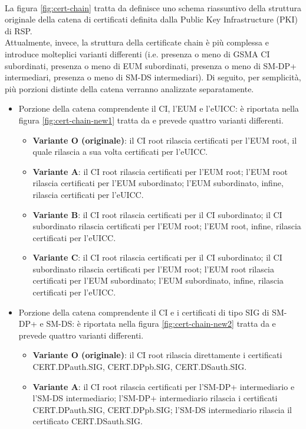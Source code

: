 \documentclass[10pt, oneside]{book}
\begin{document}
\\La figura \ref{fig:cert-chain} tratta da \cite{GSMA-docs-old} definisce uno schema riassuntivo della struttura originale della catena di certificati definita dalla Public Key Infrastructure (PKI) di RSP.\\
Attualmente, invece, la struttura della certificate chain è più complessa e introduce molteplici varianti differenti (i.e. presenza o meno di GSMA CI subordinati, presenza o meno di EUM subordinati, presenza o meno di SM-DP+ intermediari, presenza o meno di SM-DS intermediari). Di seguito, per semplicità, più porzioni distinte della catena verranno analizzate separatamente.
\begin{itemize}
\item Porzione della catena comprendente il CI, l'EUM e l'eUICC: è riportata nella figura \ref{fig:cert-chain-new1} tratta da \cite{GSMA-docs-new} e prevede quattro varianti differenti.
\begin{itemize}
\item \textbf{Variante O (originale)}: il CI root rilascia certificati per l'EUM root, il quale rilascia a sua volta certificati per l'eUICC.
\item \textbf{Variante A}: il CI root rilascia certificati per l'EUM root; l'EUM root rilascia certificati per l'EUM subordinato; l'EUM subordinato, infine, rilascia certificati per l'eUICC.
\item \textbf{Variante B}: il CI root rilascia certificati per il CI subordinato; il CI subordinato rilascia certificati per l'EUM root; l'EUM root, infine, rilascia certificati per l'eUICC.
\item \textbf{Variante C}: il CI root rilascia certificati per il CI subordinato; il CI subordinato rilascia certificati per l'EUM root; l'EUM root rilascia certificati per l'EUM subordinato; l'EUM subordinato, infine, rilascia certificati per l'eUICC.
\end{itemize}
\item Porzione della catena comprendente il CI e i certificati di tipo SIG di SM-DP+ e SM-DS: è riportata nella figura \ref{fig:cert-chain-new2} tratta da \cite{GSMA-docs-new} e prevede quattro varianti differenti.
\begin{itemize}
\item \textbf{Variante O (originale)}: il CI root rilascia direttamente i certificati CERT.DPauth.SIG, CERT.DPpb.SIG, CERT.DSauth.SIG.
\item \textbf{Variante A}: il CI root rilascia certificati per l'SM-DP+ intermediario e l'SM-DS intermediario; l'SM-DP+ intermediario rilascia i certificati  CERT.DPauth.SIG, CERT.DPpb.SIG; l'SM-DS intermediario rilascia il certificato CERT.DSauth.SIG.

\end{itemize}
\end{itemize}
\end{document}
